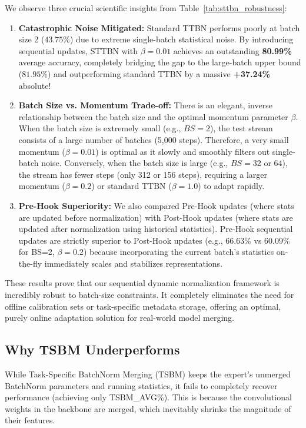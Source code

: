 \documentclass{article}
\theoremstyle{plain}
\theoremstyle{definition}
\theoremstyle{remark}
\begin{document}
We observe three crucial scientific insights from Table~\ref{tab:sttbn_robustness}:
\begin{enumerate}
    \item \textbf{Catastrophic Noise Mitigated:} Standard TTBN performs poorly at batch size 2 ($43.75\%$) due to extreme single-batch statistical noise. By introducing sequential updates, STTBN with $\beta = 0.01$ achieves an outstanding \textbf{80.99\%} average accuracy, completely bridging the gap to the large-batch upper bound ($81.95\%$) and outperforming standard TTBN by a massive \textbf{+37.24\%} absolute!
    \item \textbf{Batch Size vs. Momentum Trade-off:} There is an elegant, inverse relationship between the batch size and the optimal momentum parameter $\beta$. When the batch size is extremely small (e.g., $BS=2$), the test stream consists of a large number of batches (5,000 steps). Therefore, a very small momentum ($\beta = 0.01$) is optimal as it slowly and smoothly filters out single-batch noise. Conversely, when the batch size is large (e.g., $BS=32$ or $64$), the stream has fewer steps (only 312 or 156 steps), requiring a larger momentum ($\beta = 0.2$) or standard TTBN ($\beta = 1.0$) to adapt rapidly.
    \item \textbf{Pre-Hook Superiority:} We also compared Pre-Hook updates (where stats are updated before normalization) with Post-Hook updates (where stats are updated after normalization using historical statistics). Pre-Hook sequential updates are strictly superior to Post-Hook updates (e.g., 66.63\% vs 60.09\% for BS=2, $\beta=0.2$) because incorporating the current batch's statistics on-the-fly immediately scales and stabilizes representations.
\end{enumerate}

These results prove that our sequential dynamic normalization framework is incredibly robust to batch-size constraints. It completely eliminates the need for offline calibration sets or task-specific metadata storage, offering an optimal, purely online adaptation solution for real-world model merging.

\subsection{Why TSBM Underperforms}

While Task-Specific BatchNorm Merging (TSBM) keeps the expert's unmerged BatchNorm parameters and running statistics, it fails to completely recover performance (achieving only {{TSBM_AVG}}\%). This is because the convolutional weights in the backbone are merged, which inevitably shrinks the magnitude of their features.
\end{document}
